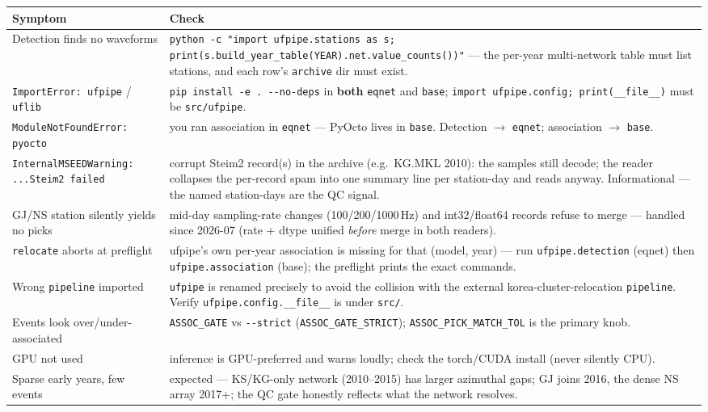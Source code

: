 \documentclass[11pt]{article}
\newcommand{\code}[1]{\texttt{#1}}
\begin{document}
\begin{center}
\small
\begin{tabular}{@{}>{\raggedright\arraybackslash}p{6.0cm}>{\raggedright\arraybackslash}p{8.5cm}@{}}
\toprule
Symptom & Check \\
\midrule
Detection finds no waveforms & \code{python -c "import ufpipe.stations as s; print(s.build\_year\_table(YEAR).net.value\_counts())"} --- the per-year multi-network table must list stations, and each row's \code{archive} dir must exist. \\
\code{ImportError: ufpipe} / \code{uflib} & \code{pip install -e . -{}-no-deps} in \textbf{both} \code{eqnet} and \code{base}; \code{import ufpipe.config; print(\_\_file\_\_)} must be \code{src/ufpipe}. \\
\code{ModuleNotFoundError: pyocto} & you ran association in \code{eqnet} --- PyOcto lives in \code{base}. Detection $\to$ \code{eqnet}; association $\to$ \code{base}. \\
\code{InternalMSEEDWarning: ...Steim2 failed} & corrupt Steim2 record(s) in the archive (e.g.\ KG.MKL 2010): the samples still decode; the reader collapses the per-record spam into one summary line per station-day and reads anyway. Informational --- the named station-days are the QC signal. \\
GJ/NS station silently yields no picks & mid-day sampling-rate changes (100/200/1000\,Hz) and int32/float64 records refuse to merge --- handled since 2026-07 (rate + dtype unified \emph{before} merge in both readers). \\
\code{relocate} aborts at preflight & ufpipe's own per-year association is missing for that (model, year) --- run \code{ufpipe.detection} (eqnet) then \code{ufpipe.association} (base); the preflight prints the exact commands. \\
Wrong \code{pipeline} imported & \code{ufpipe} is renamed precisely to avoid the collision with the external korea-cluster-relocation \code{pipeline}. Verify \code{ufpipe.config.\_\_file\_\_} is under \code{src/}. \\
Events look over/under-associated & \code{ASSOC\_GATE} vs \code{-{}-strict} (\code{ASSOC\_GATE\_STRICT}); \code{ASSOC\_PICK\_MATCH\_TOL} is the primary knob. \\
GPU not used & inference is GPU-preferred and warns loudly; check the torch/CUDA install (never silently CPU). \\
Sparse early years, few events & expected --- KS/KG-only network (2010--2015) has larger azimuthal gaps; GJ joins 2016, the dense NS array 2017+; the QC gate honestly reflects what the network resolves. \\

\end{tabular}
\end{center}
\end{document}
